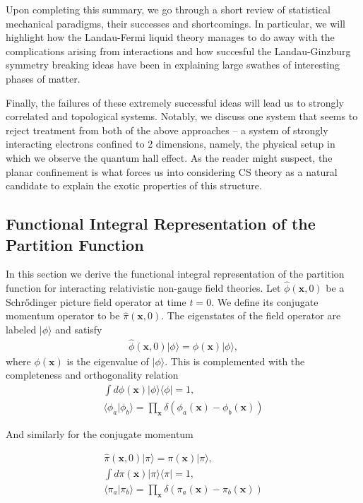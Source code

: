         Upon completing this summary, we go through a short review of statistical mechanical paradigms, their successes and shortcomings. In particular, we will highlight how the Landau-Fermi liquid theory manages to do away with the complications arising from interactions and how succesful the Landau-Ginzburg symmetry breaking ideas have been in explaining large swathes of interesting phases of matter. 

        Finally, the failures of these extremely successful ideas will lead us to strongly correlated and topological systems. Notably, we discuss one system that seems to reject treatment from both of the above approaches -- a system of strongly interacting electrons confined to 2 dimensions, namely, the physical setup in which we observe the quantum hall effect. As the reader might suspect, the planar confinement is what forces us into considering CS theory as a natural candidate to explain the exotic properties of this structure.
        \subsection{Functional Integral Representation of the Partition Function}
        In this section we derive the functional integral representation of the partition function for interacting relativistic non-gauge field theories.
        Let $\hat{\phi}(\bm{x},0)$ be a Schr{\H o}dinger picture field operator at time $t=0$. We define its conjugate momentum operator to be $\hat{\pi}(\bm{x},0)$. The eigenstates of the field operator are labeled $| \phi \rangle$ and satisfy
        \begin{align}
            \hat{\phi}(\bm{x},0) | \phi \rangle = \phi(\bm{x}) | \phi \rangle,
        \end{align}
        where $\phi(\bm{x})$ is the eigenvalue of $| \phi \rangle$. This is complemented with the completeness and orthogonality relation
        \begin{align}
            \int d \phi(\bm{x}) | \phi \rangle \langle \phi | = 1, \\
            \langle \phi_a | \phi_b \rangle = \prod_{\bm{x}} \delta(\phi_a(\bm{x}) - \phi_b(\bm{x}))
        \end{align}

        And similarly for the conjugate momentum

        \begin{align}
            \hat{\pi}(\bm{x},0) | \pi \rangle = \pi(\bm{x}) | \pi \rangle, \\
            \int d \pi(\bm{x}) | \pi \rangle \langle \pi | = 1, \\
            \langle \pi_a | \pi_b \rangle = \prod_{\bm{x}} \delta(\pi_a(\bm{x}) - \pi_b(\bm{x}))
        \end{align}

